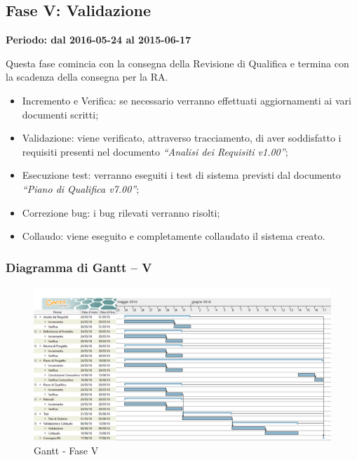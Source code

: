 \documentclass[../PianoProgetto.tex]{subfiles}
\begin{document}
	
	\subsection{Fase V: Validazione}
		\textbf{Periodo: dal 2016-05-24 al 2015-06-17}
		
		Questa fase comincia con la consegna della Revisione di Qualifica e termina con la scadenza della consegna per la RA.

		\begin{itemize}
				\item Incremento e Verifica: se necessario verranno effettuati aggiornamenti ai vari documenti scritti;

				\item Validazione: viene verificato, attraverso tracciamento, di aver soddisfatto i requisiti presenti nel documento \textit{“Analisi dei Requisiti v1.00”};

				\item Esecuzione test: verranno eseguiti i test di sistema previsti dal documento \textit{“Piano di Qualifica v7.00”};

				\item Correzione bug: i bug rilevati verranno risolti;

				\item Collaudo: viene eseguito e completamente collaudato il sistema creato.
		\end{itemize}
		
		\subsubsection{Diagramma di Gantt – V}
			\begin{figure}[!h]
				\centering
				\includegraphics[width=\textwidth]{gantt_png/7-verifica}
				\caption{Gantt - Fase V}
				\label{fig:Gantt - Fase V}
			\end{figure}
			
\end{document}
